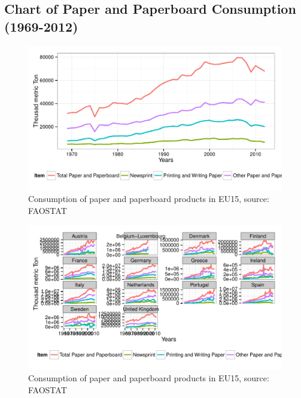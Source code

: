 \documentclass{scrartcl}\usepackage{graphicx, color}
\newenvironment{knitrout}{}{} %
\begin{document}
\subsection{Chart of Paper and Paperboard Consumption (1969-2012)}
\begin{knitrout}
\color{fgcolor}\begin{figure}[h]


{\centering \includegraphics[width=.7\linewidth]{figure/ConsumptionEU15Extended1} 

}

\caption[Consumption of paper and paperboard products in EU15, source]{Consumption of paper and paperboard products in EU15, source: FAOSTAT\label{fig:ConsumptionEU15Extended1}}
\end{figure}

\begin{figure}[h]


{\centering \includegraphics[width=.7\linewidth]{figure/ConsumptionEU15Extended2} 

}

\caption[Consumption of paper and paperboard products in EU15, source]{Consumption of paper and paperboard products in EU15, source: FAOSTAT\label{fig:ConsumptionEU15Extended2}}
\end{figure}


\end{knitrout}
\end{document}
